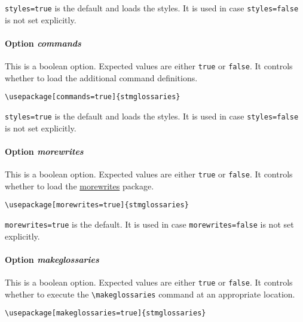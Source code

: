 \documentclass[%
  type=article,%
  layout=koma,%
  hyperref=true,%
  conditionallox=true,%
  conditionalloxnewpage=false,%
  date=true,%
  index=true,%
  listings=true%
]{stmtext}
\begin{document}
\texttt{styles=true} is the default and loads the styles. It is used in case \texttt{styles=false} is not set explicitly.

\paragraph{Option \protect\textit{commands}}
\label{sec:usage:preamble:wholepackage:options:commands}

This is a boolean option. Expected values are either \texttt{true} or \texttt{false}. It controls whether to load the additional command definitions.

\begin{verbatim}
\usepackage[commands=true]{stmglossaries}
\end{verbatim}

\texttt{styles=true} is the default and loads the styles. It is used in case \texttt{styles=false} is not set explicitly.

\paragraph{Option \protect\textit{morewrites}}
\label{sec:usage:preamble:wholepackage:options:morewrites}

This is a boolean option. Expected values are either \texttt{true} or \texttt{false}. It controls whether to load the \href{https://ctan.org/pkg/morewrites?lang=en}{morewrites} package.

\begin{verbatim}
\usepackage[morewrites=true]{stmglossaries}
\end{verbatim}

\texttt{morewrites=true} is the default. It is used in case \texttt{morewrites=false} is not set explicitly.

\paragraph{Option \protect\textit{makeglossaries}}
\label{sec:usage:preamble:wholepackage:options:makeglossaries}

This is a boolean option. Expected values are either \texttt{true} or \texttt{false}. It controls whether to execute the \texttt{\textbackslash makeglossaries} command at an appropriate location.

\begin{verbatim}
\usepackage[makeglossaries=true]{stmglossaries}
\end{verbatim}
\end{document}
